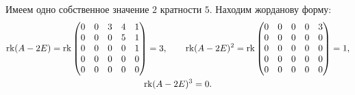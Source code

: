 \begin{solution}
	Имеем одно собственное значение $2$ кратности $5$. Находим жорданову форму:
	\begin{gather*}
		\operatorname{rk}(A - 2E) = \operatorname{rk}
		\begin{pmatrix}
			0 & 0 & 3 & 4 & 1\\
			0 & 0 & 0 & 5 & 1\\
			0 & 0 & 0 & 0 & 1\\
			0 & 0 & 0 & 0 & 0\\
			0 & 0 & 0 & 0 & 0
		\end{pmatrix} = 3,\qquad
		\operatorname{rk}(A - 2E)^2 = \operatorname{rk}
		\begin{pmatrix}
			0 & 0 & 0 & 0 & 3\\
			0 & 0 & 0 & 0 & 0\\
			0 & 0 & 0 & 0 & 0\\
			0 & 0 & 0 & 0 & 0\\
			0 & 0 & 0 & 0 & 0
		\end{pmatrix} = 1,\\
		\operatorname{rk}(A - 2E)^3 = 0.
	\end{gather*}


\end{solution}
